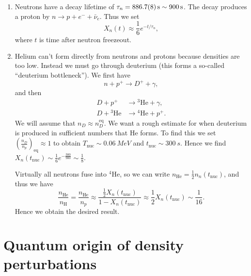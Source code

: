 \documentclass{jknotes}
\begin{document}
\begin{enumerate}
    \item Neutrons have a decay lifetime of \(\tau_n = \SI{886.7\pm0.8}{s} \sim \SI{900}{s}\). The decay produces a proton by \(n \to p + e^- + \bar\nu_e\). Thus we set 
        \begin{equation}
            X_n(t) \approx \frac16 e^{-t/\tau_n},
        \end{equation}
        where \(t\) is time after neutron freezeout.
    \item Helium can't form directly from neutrons and protons because densities are too low. Instead we must go through deuterium (this forms a so-called ``deuterium bottleneck''). We first have
        \begin{equation}
            n + p^+ \to D^+ + \gamma,
        \end{equation}
        and then
        \begin{align}
            D + p^+ &\to {}^3\text{He} + \gamma, \\
            D + {}^3\text{He} &\to {}^4\text{He} + p^+.
        \end{align}
        We will assume that \(n_D \approx n_D^{\text{eq}}\). We want a rough estimate for when deuterium is produced in sufficient numbers that He forms. To find this we set \(\left(\frac{n_D}{n_p}\right)_{\text{eq}}\approx1\) to obtain \(T_{\text{nuc}} \sim \SI{0.06}{MeV}\) and \(t_{\text{nuc}} \sim \SI{300}{s}\). Hence we find \(X_n(t_{\text{nuc}}) \sim \frac16e^{-\frac{300}{900}} \sim \frac18\).

        Virtually all neutrons fuse into \({}^4\text{He}\), so we can write \(n_{\text{He}} = \frac12n_n(t_{\text{nuc}})\), and thus we have
        \begin{equation}
            \frac{n_{\text{He}}}{n_{\text{H}}} = \frac{n_{\text{He}}}{n_p} \approx \frac{\frac12 X_n(t_{\text{nuc}})}{1 - X_n(t_{\text{nuc}})} \approx \frac12 X_n(t_{\text{nuc}}) \sim \frac1{16}.
        \end{equation}
        Hence we obtain the desired result.
\end{enumerate}

\section{Quantum origin of density perturbations}
\end{document}
